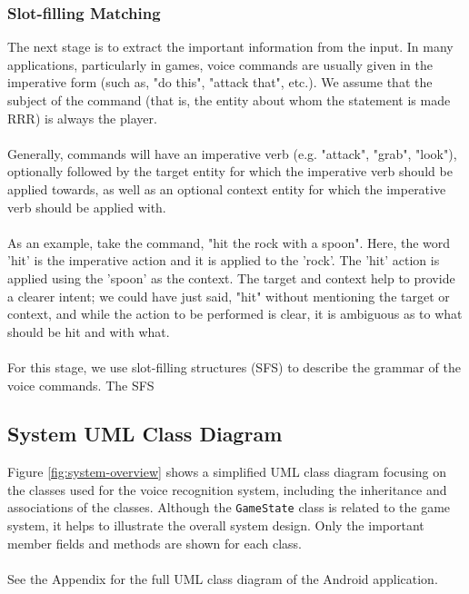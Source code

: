 \documentclass[12pt]{article}
\begin{document}
\subsubsection{Slot-filling Matching}

The next stage is to extract the important information from the input. In many applications, particularly in games, voice commands are usually given in the imperative form (such as, "do this", "attack that", etc.). We assume that the subject of the command (that is, the entity about whom the statement is made RRR) is always the player.
\\
\\
Generally, commands will have an imperative verb (e.g. "attack", "grab", "look"), optionally followed by the target entity for which the imperative verb should be applied towards, as well as an optional context entity for which the imperative verb should be applied with.
\\
\\
As an example, take the command, "hit the rock with a spoon". Here, the word 'hit' is the imperative action and it is applied to the 'rock'. The 'hit' action is applied using the 'spoon' as the context. The target and context help to provide a clearer intent; we could have just said, "hit" without mentioning the target or context, and while the action to be performed is clear, it is ambiguous as to what should be hit and with what.
\\
\\
For this stage, we use slot-filling structures (SFS) to describe the grammar of the voice commands. The SFS 

\subsection{System UML Class Diagram}

Figure \ref{fig:system-overview} shows a simplified UML class diagram focusing on the classes used for the voice recognition system, including the inheritance and associations of the classes. Although the \texttt{GameState} class is related to the game system, it helps to illustrate the overall system design. Only the important member fields and methods are shown for each class.
\\
\\
See the Appendix for the full UML class diagram of the Android application. 
\end{document}
